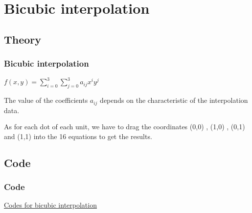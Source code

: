 \documentclass[notheorems,serif,table,compress]{beamer}  %
\begin{document}
\section{Bicubic interpolation}

\subsection*{Theory}
\begin{frame}
\frametitle{Bicubic interpolation}
    	$f(x,y)=\sum _{i=0}^{3}\sum _{j=0}^{3}a_{ij}x^{i}y^{j}$

\mbox{}

The value of the coefficients $a_{ij}$ depends on the characteristic of the interpolation data.

\mbox{}

As for each dot of each unit, we have to drag the coordinates (0,0) , (1,0) , (0,1) and (1,1) into the 16 equations to get the results.
\end{frame}

\subsection*{Code}
\begin{frame}
\frametitle{Code}
\href{code/bicubic.cpp}{Codes for bicubic interpolation}

\end{frame}
\end{document}
